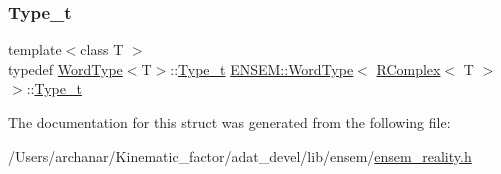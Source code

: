 \mbox{\label{structENSEM_1_1WordType_3_01RComplex_3_01T_01_4_01_4_a24d907e746d8f478924d91103a7da3d5}} 
\subsubsection{\texorpdfstring{Type\_t}{Type\_t}\hspace{0.1cm}{\footnotesize\ttfamily [2/2]}}
{\footnotesize\ttfamily template$<$class T $>$ \\
typedef \mbox{\hyperlink{structENSEM_1_1WordType}{Word\+Type}}$<$T$>$\+::\mbox{\hyperlink{structENSEM_1_1WordType_3_01RComplex_3_01T_01_4_01_4_a24d907e746d8f478924d91103a7da3d5}{Type\+\_\+t}} \mbox{\hyperlink{structENSEM_1_1WordType}{E\+N\+S\+E\+M\+::\+Word\+Type}}$<$ \mbox{\hyperlink{classENSEM_1_1RComplex}{R\+Complex}}$<$ T $>$ $>$\+::\mbox{\hyperlink{structENSEM_1_1WordType_3_01RComplex_3_01T_01_4_01_4_a24d907e746d8f478924d91103a7da3d5}{Type\+\_\+t}}}



The documentation for this struct was generated from the following file\+:\begin{DoxyCompactItemize}
\item 
/\+Users/archanar/\+Kinematic\+\_\+factor/adat\+\_\+devel/lib/ensem/\mbox{\hyperlink{lib_2ensem_2ensem__reality_8h}{ensem\+\_\+reality.\+h}}\end{DoxyCompactItemize}
